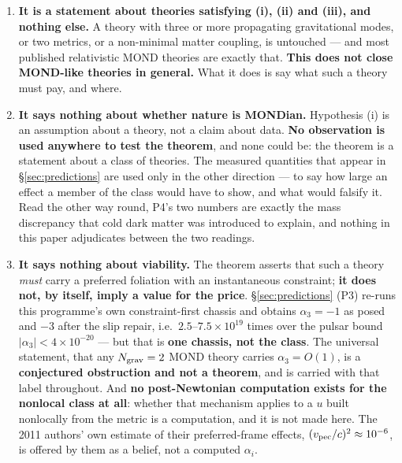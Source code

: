 \documentclass[11pt,letterpaper]{article}
\begin{document}
\begin{enumerate}\itemsep3pt
\item \textbf{It is a statement about theories satisfying (i), (ii) and (iii), and nothing else.} A theory with three or more propagating gravitational modes, or two metrics, or a non-minimal matter coupling, is untouched --- and most published relativistic MOND theories are exactly that. \textbf{This does not close MOND-like theories in general.} What it does is say what such a theory must pay, and where.
\item \textbf{It says nothing about whether nature is MONDian.} Hypothesis (i) is an assumption about a theory, not a claim about data. \textbf{No observation is used anywhere to test the theorem}, and none could be: the theorem is a statement about a class of theories. The measured quantities that appear in \S\ref{sec:predictions} are used only in the other direction --- to say how large an effect a member of the class would have to show, and what would falsify it. Read the other way round, P4's two numbers are exactly the mass discrepancy that cold dark matter was introduced to explain, and nothing in this paper adjudicates between the two readings.
\item \textbf{It says nothing about viability.} The theorem asserts that such a theory \emph{must} carry a preferred foliation with an instantaneous constraint; \textbf{it does not, by itself, imply a value for the price}. \S\ref{sec:predictions} (P3) re-runs this programme's own constraint-first chassis and obtains $\alpha_3=-1$ as posed and $-3$ after the slip repair, i.e.\ $2.5$--$7.5\times10^{19}$ times over the pulsar bound $|\alpha_3|<4\times10^{-20}$ \cite{Will2014} --- but that is \textbf{one chassis, not the class}. The universal statement, that any $N_{\rm grav}=2$ MOND theory carries $\alpha_3=O(1)$, is a \textbf{conjectured obstruction and not a theorem}, and is carried with that label throughout. And \textbf{no post-Newtonian computation exists for the nonlocal class at all}: whether that mechanism applies to a $u$ built nonlocally from the metric is a computation, and it is not made here. The 2011 authors' own estimate of their preferred-frame effects, $(v_{\rm pec}/c)^2\approx10^{-6}$, is offered by them as a belief, not a computed $\alpha_i$.

\end{enumerate}
\end{document}
